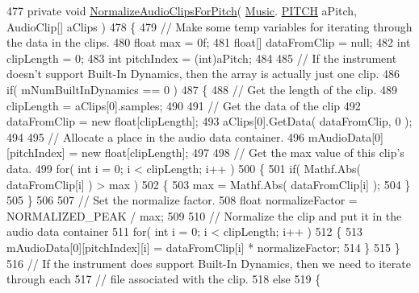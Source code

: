 \begin{DoxyCodeInclude}
{477     \textcolor{keyword}{private} \textcolor{keywordtype}{void} \hyperlink{group___v_i_base_priv_func_gaecd4f9ead08a03be878b2085055a975c}{NormalizeAudioClipsForPitch}( \hyperlink{class_music}{Music}.
      \hyperlink{group___music_enums_ga508f69b199ea518f935486c990edac1d}{PITCH} aPitch, AudioClip[] aClips )
478     \{
479         \textcolor{comment}{// Make some temp variables for iterating through the data in the clips.}
480         \textcolor{keywordtype}{float} max = 0f;
481         \textcolor{keywordtype}{float}[] dataFromClip = null;
482         \textcolor{keywordtype}{int} clipLength = 0;
483         \textcolor{keywordtype}{int} pitchIndex = (int)aPitch;
484 
485         \textcolor{comment}{// If the instrument doesn't support Built-In Dynamics, then the array is actually just one clip.}
486         \textcolor{keywordflow}{if}( mNumBuiltInDynamics == 0 )
487         \{
488             \textcolor{comment}{// Get the length of the clip.}
489             clipLength = aClips[0].samples;
490 
491             \textcolor{comment}{// Get the data of the clip}
492             dataFromClip = \textcolor{keyword}{new} \textcolor{keywordtype}{float}[clipLength];
493             aClips[0].GetData( dataFromClip, 0 );
494 
495             \textcolor{comment}{// Allocate a place in the audio data container.}
496             mAudioData[0][pitchIndex] = \textcolor{keyword}{new} \textcolor{keywordtype}{float}[clipLength];
497 
498             \textcolor{comment}{// Get the max value of this clip's data.}
499             \textcolor{keywordflow}{for}( \textcolor{keywordtype}{int} i = 0; i < clipLength; i++ )
500             \{
501                 \textcolor{keywordflow}{if}( Mathf.Abs( dataFromClip[i] ) > max )
502                 \{
503                     max = Mathf.Abs( dataFromClip[i] );
504                 \}
505             \}
506 
507             \textcolor{comment}{// Set the normalize factor.}
508             \textcolor{keywordtype}{float} normalizeFactor = NORMALIZED\_PEAK / max;
509 
510             \textcolor{comment}{// Normalize the clip and put it in the audio data container}
511             \textcolor{keywordflow}{for}( \textcolor{keywordtype}{int} i = 0; i < clipLength; i++ )
512             \{
513                 mAudioData[0][pitchIndex][i] = dataFromClip[i] * normalizeFactor;
514             \}
515         \}
516         \textcolor{comment}{// If the instrument does support Built-In Dynamics, then we need to iterate through each}
517         \textcolor{comment}{// file associated with the clip.}
518         \textcolor{keywordflow}{else}
519         \{
}
\end{DoxyCodeInclude}
